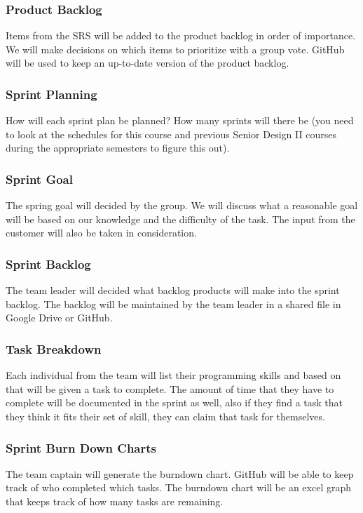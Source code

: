 \subsubsection{Product Backlog}
Items from the SRS will be added to the product backlog in order of importance. We will make decisions on which items to prioritize with a group vote. GitHub will be used to keep an up-to-date version of the product backlog.

\subsubsection{Sprint Planning}
How will each sprint plan be planned? How many sprints will there be (you need to look at the schedules for this course and previous Senior Design II courses during the appropriate semesters to figure this out).

\subsubsection{Sprint Goal}
The spring goal will decided by the group. We will discuss what a reasonable goal will be based on our knowledge and the difficulty of the task. The input from the customer will also be taken in consideration.

\subsubsection{Sprint Backlog}
The team leader will decided what backlog products will make into the sprint backlog. The backlog will be maintained by the team leader in a shared file in Google Drive or GitHub.


\subsubsection{Task Breakdown}
Each individual from the team will list their programming skills and based on that will be given a task to complete. The amount of time that they have to complete will be documented in the sprint as well, also if they find a task that they think it fits their set of skill, they can claim that task for themselves.

\subsubsection{Sprint Burn Down Charts}
The team captain will generate the burndown chart. GitHub will be able to keep track of who completed which tasks. The burndown chart will be an excel graph that keeps track of how many tasks are remaining.

